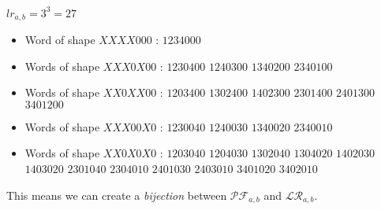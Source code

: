 \begin{example}[$a > b : a = 4, b = 3$]
    $lr_{a,b} = 3^3 = 27$
    \begin{itemize}
        \item Word of shape $XXXX000$ :
            \subitem $1234000$
        \item Words of shape $XXX0X00$ :
            \subitem $1230400$
            \hspace{2cm} $1240300$
            \hspace{2cm} $1340200$
            \subitem $2340100$
        \item Words of shape $XX0XX00$ :
            \subitem $1203400$
            \hspace{2cm} $1302400$
            \hspace{2cm} $1402300$
            \subitem $2301400$
            \hspace{2cm} $2401300$
            \hspace{2cm} $3401200$
        \item Words of shape $XXX00X0$ :
            \subitem $1230040$
            \hspace{2cm} $1240030$
            \hspace{2cm} $1340020$
            \subitem $2340010$
        \item Words of shape $XX0X0X0$ :
            \subitem $1203040$
            \hspace{2cm} $1204030$
            \hspace{2cm} $1302040$
            \subitem $1304020$
            \hspace{2cm} $1402030$
            \hspace{2cm} $1403020$
            \subitem $2301040$
            \hspace{2cm} $2304010$
            \hspace{2cm} $2401030$
            \subitem $2403010$
            \hspace{2cm} $3401020$
            \hspace{2cm} $3402010$
    \end{itemize}
    
\end{example}

\begin{prop}
    This means we can create a \emph{bijection} between
    $\mathcal{PF}_{a,b}$ and $\mathcal{LR}_{a,b}$.
\end{prop}

